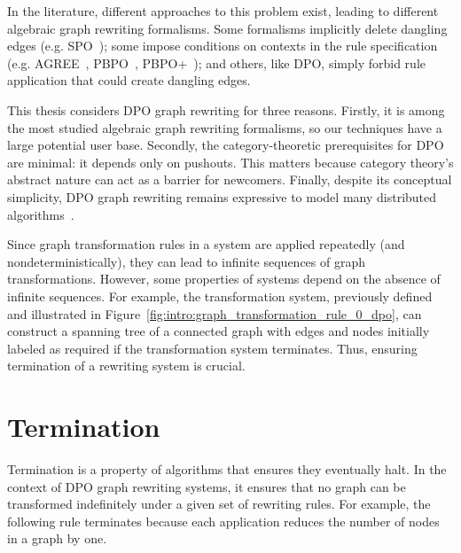 In the literature, different approaches to this problem exist, leading to different algebraic graph rewriting formalisms. Some formalisms implicitly delete dangling edges (e.g. SPO~\cite{ehrig1997algebraic}); 
some impose conditions on contexts in the rule specification (e.g. AGREE~\cite{corradini2015agree}, PBPO~\cite{corradini2019thepbpo}, PBPO+~\cite{overbeek2023graph}); and others, like DPO, simply forbid rule application that could create dangling edges.

   This thesis considers DPO graph rewriting for three reasons.
   Firstly, it is among the most studied algebraic graph rewriting formalisms, so our techniques have a large potential user base.
   Secondly, the category-theoretic prerequisites for DPO are minimal: it depends only on pushouts. This matters because category theory's abstract nature can act as a barrier for newcomers.
    Finally, despite its conceptual simplicity, DPO graph rewriting remains expressive to model many distributed algorithms~\cite{ehrig2006fundamentals,corradini1997algebraic}.
    
Since graph transformation rules in a system are applied repeatedly (and nondeterministically), they can lead to infinite sequences of graph transformations. However, some properties of systems depend on the absence of infinite sequences. For example, the transformation system, previously defined and illustrated in Figure~\ref{fig:intro:graph_transformation_rule_0_dpo}, can construct a spanning tree of a connected graph with edges and nodes initially labeled as required if the transformation system terminates. Thus, ensuring termination of a rewriting system is crucial.

\section{Termination} 
Termination is a property of algorithms that ensures they eventually halt. In the context of DPO graph rewriting systems, it ensures that no graph can be transformed indefinitely under a given set of rewriting rules. 
For example, the following rule terminates because each application reduces the number of nodes in a graph by one.

